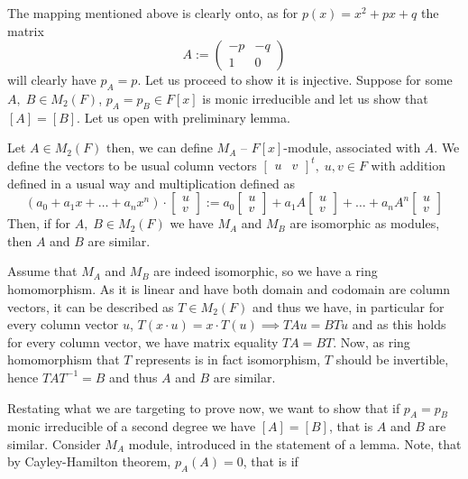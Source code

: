 \documentclass[8pt]{article} %
\begin{document}
\begin{enumerate}[label=\bfseries Problem \arabic*.]
{\begin{enumerate}[label=(\arabic*).]
{				The mapping mentioned above is clearly onto, as for $p(x)=x^2+px+q$ the matrix
				\[A:=\begin{pmatrix}-p&-q\\1&0\end{pmatrix}\]will clearly have $p_A=p$. Let us proceed to show
				it is injective. Suppose for some $A,\;B\in M_2(F)$, $p_A=p_B\in F[x]$
				is monic irreducible and let us show that $[A]=[B]$. Let us open with preliminary lemma.
				\begin{mylem}Let $A\in M_2(F)$ then, we can define $M_A$ -- $F[x]$-module, associated with $A$. We define
					the vectors to be usual column vectors $\begin{bmatrix}u&v\end{bmatrix}^t,\;u,v\in F$ with addition defined
					in a usual way and multiplication defined as
					\[(a_0+a_1x+\dots+a_nx^n)\cdot\begin{bmatrix}u\\v\end{bmatrix}:=a_0\begin{bmatrix}u\\v\end{bmatrix}+
						a_1A\begin{bmatrix}u\\v\end{bmatrix}+\dots+a_nA^n\begin{bmatrix}u\\v\end{bmatrix}\]
					Then, if for $A,\;B\in M_2(F)$ we have $M_A$ and $M_B$ are isomorphic as modules, then $A$ and $B$ are similar.
					\end{mylem}
				\begin{myproof}Assume that $M_A$ and $M_B$ are indeed isomorphic, so we have a ring homomorphism. As it is linear and have
					both domain and codomain are column vectors, it can be described as $T\in M_2(F)$ and thus we have, in particular for every
					column vector $u$, $T(x\cdot u)=x\cdot T(u)\implies TAu=BTu$ and as this holds for every column vector, we have
					matrix equality $TA=BT$. Now, as ring homomorphism that $T$ represents is in fact isomorphism, $T$ should be invertible, hence
					$TAT^{-1}=B$ and thus $A$ and $B$ are similar.
				\myqed\end{myproof}
				Restating what we are targeting to prove now, we want to show that if $p_A=p_B$ monic irreducible of a second degree
				we have $[A]=[B]$, that is $A$ and $B$ are similar.
				Consider $M_A$ module, introduced in the statement of a lemma. Note, that by Cayley-Hamilton theorem, $p_A(A)=0$, that is if
}
\end{enumerate}}
\end{enumerate}
\end{document}
